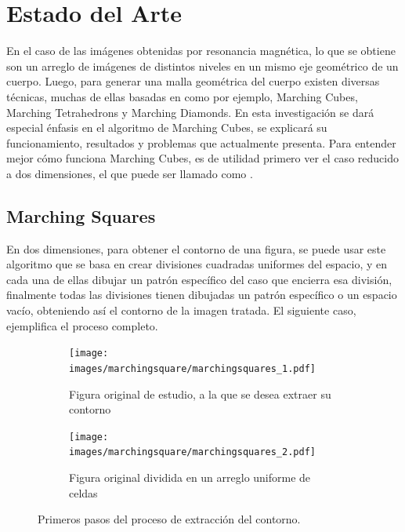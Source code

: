\chapter{Estado del Arte}
\label{ch:estadoDelArte}

En el caso de las imágenes obtenidas por resonancia magnética, lo que se obtiene son un
arreglo de imágenes de distintos niveles en un mismo eje geométrico de un cuerpo. Luego, para
generar una malla geométrica del cuerpo existen diversas técnicas, muchas de ellas basadas en
 como por ejemplo, Marching Cubes\cite{Lorensen87marchingcubes}, Marching Tetrahedrons\cite{Shirley90apolygonal} y Marching Diamonds.
En esta investigación se dará especial énfasis en el algoritmo de Marching Cubes, se
explicará su funcionamiento, resultados y problemas que actualmente presenta.
Para entender mejor cómo funciona Marching Cubes, es de utilidad primero ver el caso
reducido a dos dimensiones, el que puede ser llamado como .

\section{Marching Squares}
\label{sec:marchingSquares}

En dos dimensiones, para obtener el contorno de una figura, se puede usar este algoritmo
que se basa en crear divisiones cuadradas uniformes del espacio, y en cada una de ellas dibujar un
patrón específico del caso que encierra esa división, finalmente todas las divisiones tienen
dibujadas un patrón específico o un espacio vacío, obteniendo así el contorno de la imagen
tratada. El siguiente caso, ejemplifica el proceso completo.

\newpage
\begin{figure}[h]

	\begin{subfigure}[h]{0.46\textwidth}
		\centering
			\texttt{[image: images/marchingsquare/marchingsquares\_1.pdf]}
		\caption{Figura original de estudio, a la que se desea extraer su contorno}
		\label{f:estadoDelArte:original}
	\end{subfigure}
	\quad
	\begin{subfigure}[h]{0.46\textwidth}
		\centering
			\texttt{[image: images/marchingsquare/marchingsquares\_2.pdf]}
		\caption{Figura original dividida en un arreglo uniforme de celdas}
		\label{f:estadoDelArte:division}
	\end{subfigure}

	\caption{Primeros pasos del proceso de extracción del contorno.}

\end{figure}

